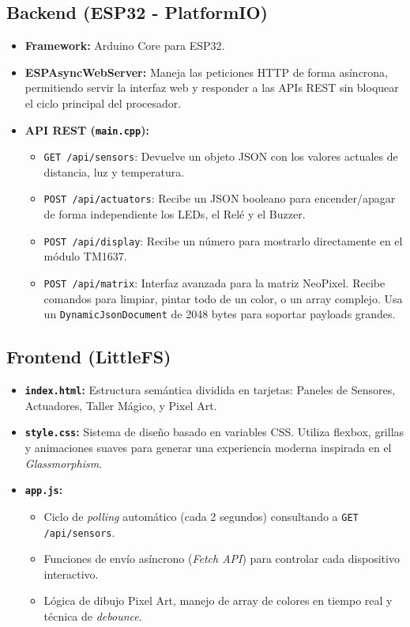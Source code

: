 \documentclass[12pt,a4paper]{article}
\begin{document}
\subsection{Backend (ESP32 - PlatformIO)}
\begin{itemize}
    \item \textbf{Framework:} Arduino Core para ESP32.
    \item \textbf{ESPAsyncWebServer:} Maneja las peticiones HTTP de forma asíncrona, permitiendo servir la interfaz web y responder a las APIs REST sin bloquear el ciclo principal del procesador.
    \item \textbf{API REST (\texttt{main.cpp}):}
    \begin{itemize}
        \item \texttt{GET /api/sensors}: Devuelve un objeto JSON con los valores actuales de distancia, luz y temperatura.
        \item \texttt{POST /api/actuators}: Recibe un JSON booleano para encender/apagar de forma independiente los LEDs, el Relé y el Buzzer.
        \item \texttt{POST /api/display}: Recibe un número para mostrarlo directamente en el módulo TM1637.
        \item \texttt{POST /api/matrix}: Interfaz avanzada para la matriz NeoPixel. Recibe comandos para limpiar, pintar todo de un color, o un array complejo. Usa un \texttt{DynamicJsonDocument} de 2048 bytes para soportar payloads grandes.
    \end{itemize}
\end{itemize}

\subsection{Frontend (LittleFS)}
\begin{itemize}
    \item \textbf{\texttt{index.html}:} Estructura semántica dividida en tarjetas: Paneles de Sensores, Actuadores, Taller Mágico, y Pixel Art.
    \item \textbf{\texttt{style.css}:} Sistema de diseño basado en variables CSS. Utiliza flexbox, grillas y animaciones suaves para generar una experiencia moderna inspirada en el \textit{Glassmorphism}.
    \item \textbf{\texttt{app.js}:} 
    \begin{itemize}
        \item Ciclo de \textit{polling} automático (cada 2 segundos) consultando a \texttt{GET /api/sensors}.
        \item Funciones de envío asíncrono (\textit{Fetch API}) para controlar cada dispositivo interactivo.
        \item Lógica de dibujo Pixel Art, manejo de array de colores en tiempo real y técnica de \textit{debounce}.
    \end{itemize}
\end{itemize}
\end{document}
